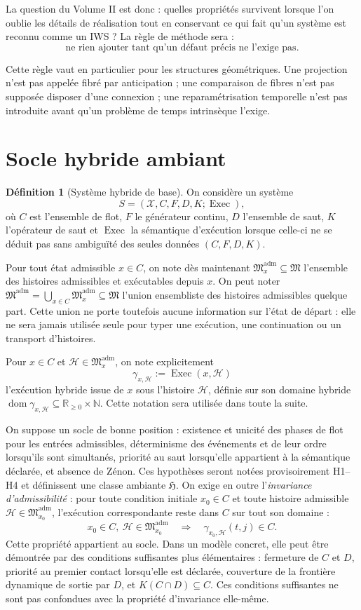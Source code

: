 \documentclass[11pt,a4paper]{article}
\theoremstyle{definition}
\newtheorem{definition}{Définition}[section]
\theoremstyle{remark}
\newcommand{\Hyb}{\mathfrak H}
\newcommand{\X}{\mathcal X}
\newcommand{\M}{\mathfrak M}
\newcommand{\Madm}{\mathfrak M^{\mathrm{adm}}}
\newcommand{\Exec}{\operatorname{Exec}}
\begin{document}
La question du Volume II est donc : quelles propriétés survivent lorsque l'on oublie les détails de réalisation tout en conservant ce qui fait qu'un système est reconnu comme un IWS ? La règle de méthode sera :
\[
\boxed{\text{ne rien ajouter tant qu'un défaut précis ne l'exige pas.}}
\]

Cette règle vaut en particulier pour les structures géométriques. Une projection n'est pas appelée fibré par anticipation ; une comparaison de fibres n'est pas supposée disposer d'une connexion ; une reparamétrisation temporelle n'est pas introduite avant qu'un problème de temps intrinsèque l'exige.

\section{Socle hybride ambiant}

\begin{definition}[Système hybride de base]
On considère un système
\[
S=(\X,C,F,D,K;\Exec),
\]
où $C$ est l'ensemble de flot, $F$ le générateur continu, $D$ l'ensemble de saut, $K$ l'opérateur de saut et $\Exec$ la sémantique d'exécution lorsque celle-ci ne se déduit pas sans ambiguïté des seules données $(C,F,D,K)$.
\end{definition}

Pour tout état admissible $x\in C$, on note dès maintenant $\Madm_x\subseteq\M$ l'ensemble des histoires admissibles et exécutables depuis $x$. On peut noter $\Madm=\bigcup_{x\in C}\Madm_x\subseteq\M$ l'union ensembliste des histoires admissibles quelque part. Cette union ne porte toutefois aucune information sur l'état de départ : elle ne sera jamais utilisée seule pour typer une exécution, une continuation ou un transport d'histoires.

Pour $x\in C$ et $\mathcal H\in\Madm_x$, on note explicitement
\[
\boxed{\gamma_{x,\mathcal H}:=\Exec(x,\mathcal H)}
\]
l'exécution hybride issue de $x$ sous l'histoire $\mathcal H$, définie sur son domaine hybride $\operatorname{dom}\gamma_{x,\mathcal H}\subseteq\mathbb R_{\geq0}\times\mathbb N$. Cette notation sera utilisée dans toute la suite.

On suppose un socle de bonne position : existence et unicité des phases de flot pour les entrées admissibles, déterminisme des événements et de leur ordre lorsqu'ils sont simultanés, priorité au saut lorsqu'elle appartient à la sémantique déclarée, et absence de Zénon. Ces hypothèses seront notées provisoirement H1--H4 et définissent une classe ambiante $\Hyb$. On exige en outre l'\emph{invariance d'admissibilité} : pour toute condition initiale $x_0\in C$ et toute histoire admissible $\mathcal H\in\Madm_{x_0}$, l'exécution correspondante reste dans $C$ sur tout son domaine :
\[
\boxed{x_0\in C,\ \mathcal H\in\Madm_{x_0}
\quad\Longrightarrow\quad
\gamma_{x_0,\mathcal H}(t,j)\in C.}
\]
Cette propriété appartient au socle. Dans un modèle concret, elle peut être démontrée par des conditions suffisantes plus élémentaires : fermeture de $C$ et $D$, priorité au premier contact lorsqu'elle est déclarée, couverture de la frontière dynamique de sortie par $D$, et $K(C\cap D)\subseteq C$. Ces conditions suffisantes ne sont pas confondues avec la propriété d'invariance elle-même.
\end{document}

